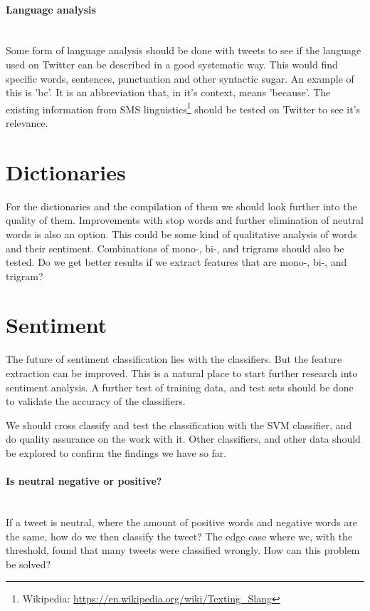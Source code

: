 \paragraph{Language analysis}
\hspace{0pt}\\
Some form of language analysis should be done with tweets to see if the
language used on Twitter can be described in a good systematic way. This would
find specific words, sentences, punctuation and other syntactic sugar. 
An example of this is 'bc'. It is an abbreviation that, in it's
context, means 'because'. The existing information from SMS
linguistics\footnote{Wikipedia:
\url{https://en.wikipedia.org/wiki/Texting_Slang}} should be
tested on Twitter to see it's relevance. 
%

\section{Dictionaries}\label{future_work:dictionaries}
For the dictionaries and the compilation of them we should look further into
the quality of them. Improvements with stop words and further elimination of
neutral words is also an option. This could be some kind of qualitative
analysis of words and their sentiment. Combinations of mono-, bi-, and trigrams
should also be tested. Do we get better results if we extract features that are
mono-, bi-, and trigram? 
%

\section{Sentiment}\label{future_work:sentiment}
The future of sentiment classification lies with the classifiers. But the
feature extraction can be improved. This is a natural place to start further
research into sentiment analysis. A further test of training data, and test sets
should be done to validate the accuracy of the classifiers.   

We should cross classify and test the classification with the SVM classifier,
and do quality assurance on the work with it.
Other classifiers, and other data should be explored to confirm the findings we
have so far. 
 
\paragraph{Is neutral negative or positive?}
\hspace{0pt}\\
If a tweet is neutral, where the amount of positive words and
negative words are the same, how do we then classify the tweet? The edge case
where we, with the threshold, found that many tweets were classified wrongly.
How can this problem be solved?

